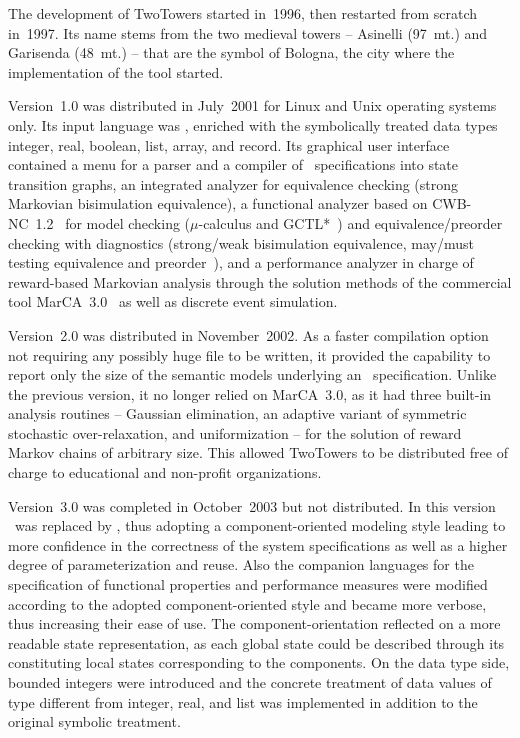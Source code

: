The development of TwoTowers started in~1996, then restarted from scratch in~1997. Its name stems from the
two medieval towers -- Asinelli (97~mt.) and Garisenda (48~mt.) -- that are the symbol of Bologna, the city
where the implementation of the tool started.

Version~1.0 was distributed in July~2001 for Linux and Unix operating systems only. Its input language was
\empagr, enriched with the symbolically treated data types integer, real, boolean, list, array, and record.
Its graphical user interface contained a menu for a parser and a compiler of \empagr\ specifications into
state transition graphs, an integrated analyzer for equivalence checking (strong Markovian bisimulation
equivalence), a functional analyzer based on CWB-NC~1.2~\cite{CS} for model checking ($\mu$-calculus and
GCTL*~\cite{CGP}) and equivalence/preorder checking with diagnostics (strong/weak bisimulation equivalence,
may/must testing equivalence and preorder~\cite{DH}), and a performance analyzer in charge of reward-based
Markovian analysis through the solution methods of the commercial tool MarCA~3.0~\cite{Ste2} as well as
discrete event simulation.

Version~2.0 was distributed in November~2002. As a faster compilation option not requiring any possibly huge
file to be written, it provided the capability to report only the size of the semantic models underlying an
\empagr\ specification. Unlike the previous version, it no longer relied on MarCA~3.0, as it had three
built-in analysis routines -- Gaussian elimination, an adaptive variant of symmetric stochastic
over-relaxation, and uniformization -- for the solution of reward Markov chains of arbitrary size. This
allowed TwoTowers to be distributed free of charge to educational and non-profit organizations.

Version~3.0 was completed in October~2003 but not distributed. In this version \empagr\ was replaced by
\aemilia, thus adopting a component-oriented modeling style leading to more confidence in the correctness of
the system specifications as well as a higher degree of parameterization and reuse. Also the companion
languages for the specification of functional properties and performance measures were modified according to
the adopted component-oriented style and became more verbose, thus increasing their ease of use. The
component-orientation reflected on a more readable state representation, as each global state could be
described through its constituting local states corresponding to the components. On the data type side,
bounded integers were introduced and the concrete treatment of data values of type different from integer,
real, and list was implemented in addition to the original symbolic treatment.

